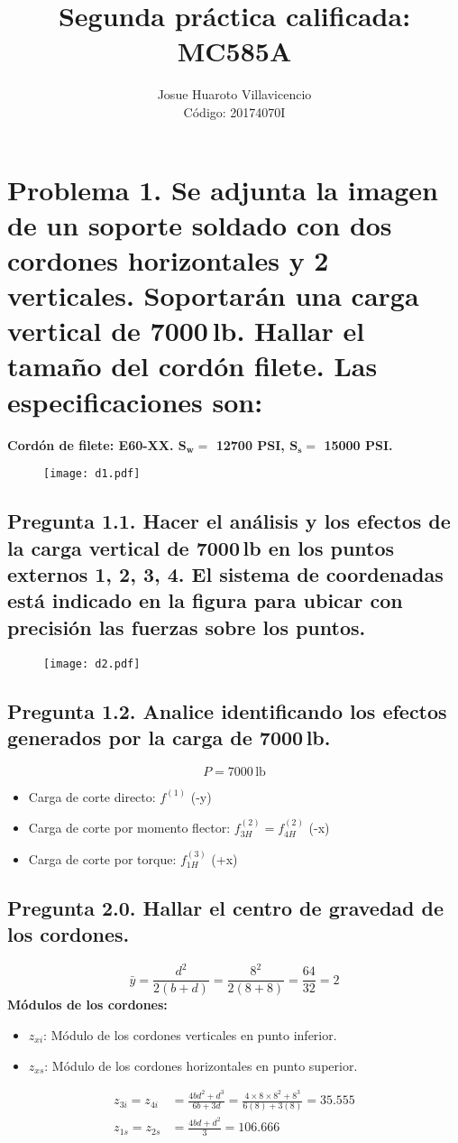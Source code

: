 \documentclass[a4paper,11pt]{article}
\title{Segunda práctica calificada: MC585A}
\author{Josue Huaroto Villavicencio\\
Código: 20174070I}
\newcommand{\mbf}{\mathbf}
\newcommand{\mrm}{\mathrm}
\begin{document}
\maketitle
\section*{Problema 1. Se adjunta la imagen de un soporte soldado con dos cordones horizontales y 2 verticales. Soportarán una carga vertical de 7000$\,$lb. Hallar el tamaño del cordón filete. Las especificaciones son:}
\textbf{Cordón de filete: E60-XX. $\mbf{S_{w}} =$ 12700 PSI, $\mbf{S_{s} =}$ 15000 PSI.}
\begin{figure}[H]
    \centering
    \texttt{[image: d1.pdf]}
\end{figure}
\subsection*{Pregunta 1.1. Hacer el análisis y los efectos de la carga vertical de 7000$\,$lb en los puntos externos 1, 2, 3, 4. El sistema de coordenadas está indicado en la figura para ubicar con precisión las fuerzas sobre los puntos.}
\begin{figure}[H]
    \centering
    \texttt{[image: d2.pdf]}
\end{figure}
\subsection*{Pregunta 1.2. Analice identificando los efectos generados por la carga de 7000$\,$lb.}
$$
P = 7000\,\mrm{lb}
$$
\begin{itemize}
    \item Carga de corte directo: $f^{(1)}$ (-y)
    \item Carga de corte por momento flector: $f^{(2)}_{3H} = f^{(2)}_{4H}$ (-x)
    \item Carga de corte por torque: $f^{(3)}_{1H}$ (+x)
\end{itemize}
\subsection*{Pregunta 2.0. Hallar el centro de gravedad de los cordones.}
$$
\bar{y} = \frac{d^{2}}{2(b+d)} = \frac{8^{2}}{2(8+8)} = \frac{64}{32} = 2
$$
\textbf{Módulos de los cordones:\\}
\begin{itemize}
    \item $z_{xi}$: Módulo de los cordones verticales en punto inferior.
    \item $z_{xs}$: Módulo de los cordones horizontales en punto superior.
\end{itemize}
\begin{align*}
    z_{3i} = z_{4i} &= \frac{4bd^{2}+d^{3}}{6b+3d} = \frac{4\times 8\times 8^{2} + 8^{3}}{6(8) + 3(8)} = 35.555\\
    z_{1s} = z_{2s} &= \frac{4bd + d^{2}}{3} = 106.666
\end{align*}
\end{document}
